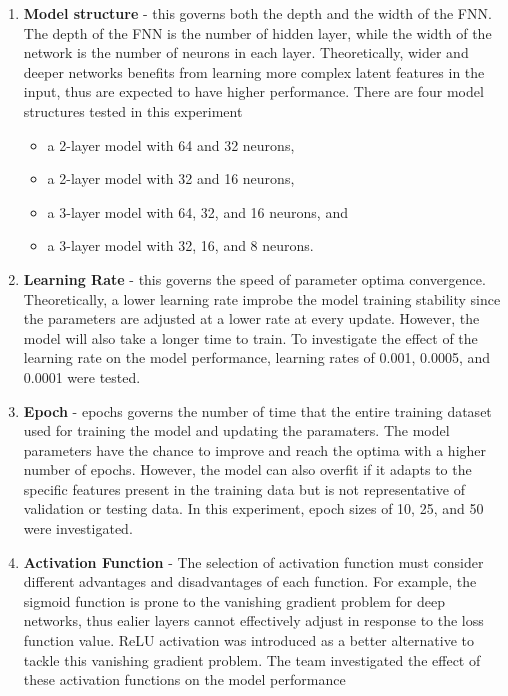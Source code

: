 \documentclass[a4paper]{article}
\begin{document}
\begin{enumerate}
    \item \textbf{Model structure} - this governs both the depth and the width of the FNN. The depth of the FNN is the number of hidden layer, while the width of the network is the number of neurons in each layer. Theoretically, wider and deeper networks benefits from learning more complex latent features in the input, thus are expected to have higher performance. There are four model structures tested in this experiment
    \begin{itemize}
        \item a 2-layer model with 64 and 32 neurons,
        \item a 2-layer model with 32 and 16 neurons,
        \item a 3-layer model with 64, 32, and 16 neurons, and
        \item a 3-layer model with 32, 16, and 8 neurons.
    \end{itemize}
    \item \textbf{Learning Rate} - this governs the speed of parameter optima convergence. Theoretically, a lower learning rate improbe the model training stability since the parameters are adjusted at a lower rate at every update. However, the model will also take a longer time to train. To investigate the effect of the learning rate on the model performance, learning rates of 0.001, 0.0005, and 0.0001 were tested.
    \item \textbf{Epoch} - epochs governs the number of time that the entire training dataset used for training the model and updating the paramaters. The model parameters have the chance to improve and reach the optima with a higher number of epochs. However, the model can also overfit if it adapts to the specific features present in the training data but is not representative of validation or testing data. In this experiment, epoch sizes of 10, 25, and 50 were investigated.
    \item \textbf{Activation Function} - The selection of activation function must consider different advantages and disadvantages of each function. For example, the sigmoid function is prone to the vanishing gradient problem for deep networks, thus ealier layers cannot effectively adjust in response to the loss function value. ReLU activation was introduced as a better alternative to tackle this vanishing gradient problem. The team investigated the effect of these activation functions on the model performance
\end{enumerate}
\end{document}
